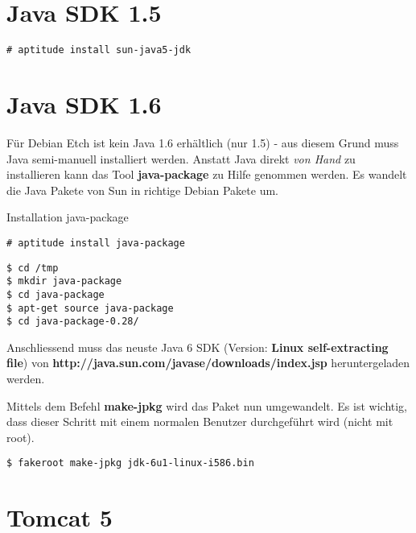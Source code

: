 \documentclass[12pt,halfparskip]{scrreprt}
\begin{document}

\section{Java SDK 1.5} %
\label{sec:java_sdk_1_5}

\begin{verbatim}
# aptitude install sun-java5-jdk
\end{verbatim}


\section{Java SDK 1.6} %
\label{sec:java_sdk}

Für Debian Etch ist kein Java 1.6 erhältlich (nur 1.5) - aus diesem Grund muss Java semi-manuell installiert werden. Anstatt Java direkt \emph{von Hand} zu installieren kann das Tool \textbf{java-package} zu Hilfe genommen werden. Es wandelt die Java Pakete von Sun in richtige Debian Pakete um. 

Installation java-package

\begin{verbatim}
# aptitude install java-package  
\end{verbatim}

\begin{verbatim}
$ cd /tmp
$ mkdir java-package
$ cd java-package
$ apt-get source java-package
$ cd java-package-0.28/
\end{verbatim}

Anschliessend muss das neuste Java 6 SDK (Version: \textbf{Linux self-extracting file}) von \textbf{http://java.sun.com/javase/downloads/index.jsp} heruntergeladen werden.


Mittels dem Befehl \textbf{make-jpkg} wird das Paket nun umgewandelt. Es ist wichtig, dass dieser Schritt mit einem normalen Benutzer durchgeführt wird (nicht mit root).

\begin{verbatim}
$ fakeroot make-jpkg jdk-6u1-linux-i586.bin 
\end{verbatim}


\section{Tomcat 5} %
\label{sec:tomcat_5}
\end{document}

